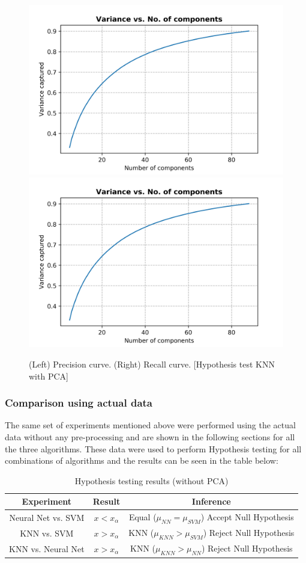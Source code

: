 \documentclass[10pt]{scrartcl}
\begin{document}
\begin{itemize}
\begin{figure}[H]
\centering
\includegraphics[width=0.45\linewidth]{figures/pca_variance_vs_no_comp.png} 
\includegraphics[width=0.45\linewidth]{figures/pca_variance_vs_no_comp.png}
\caption{(Left) Precision curve. (Right) Recall curve. [Hypothesis test KNN with PCA] \label{fig:hypo_pca_knn_pre_recl}}
\end{figure}

\end{itemize}

\subsubsection*{Comparison using actual data}

The same set of experiments mentioned above were performed using the actual data without any pre-processing and are shown in the following sections for all the three algorithms. These data were used to perform Hypothesis testing for all combinations of algorithms and the results can be seen in the table below:

\begin{table}[H] 
\centering
\begin{tabular}{ c|c|c }
 \textbf{Experiment} & \textbf{Result} & \textbf{Inference} \\ 
 \hline
Neural Net vs. SVM & $x < x_{\alpha}$ & Equal ($\mu_{NN} = \mu_{SVM}$) Accept Null Hypothesis\\ 
KNN vs. SVM & $x > x_{\alpha}$ &  KNN ($\mu_{KNN} > \mu_{SVM}$) Reject Null Hypothesis\\ 
KNN vs. Neural Net & $x > x_{\alpha}$ &  KNN ($\mu_{KNN} > \mu_{NN}$) Reject Null Hypothesis \\
\end{tabular}
\caption{Hypothesis testing results (without PCA) \label{tab:hypo_test_actual}}
\end{table}
\end{document}
